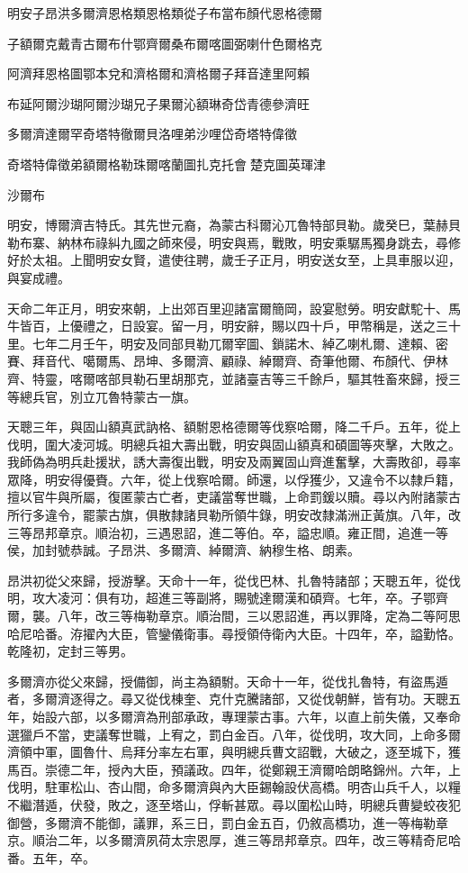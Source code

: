 
\begin{pinyinscope}
明安子昂洪多爾濟恩格類恩格類從子布當布顏代恩格德爾

子額爾克戴青古爾布什鄂齊爾桑布爾喀圖弼喇什色爾格克

阿濟拜恩格圖鄂本兌和濟格爾和濟格爾子拜音達里阿賴

布延阿爾沙瑚阿爾沙瑚兄子果爾沁額琳奇岱青德參濟旺

多爾濟達爾罕奇塔特徹爾貝洛哩弟沙哩岱奇塔特偉徵

奇塔特偉徵弟額爾格勒珠爾喀蘭圖扎克托會楚克圖英琿津

沙爾布

明安，博爾濟吉特氏。其先世元裔，為蒙古科爾沁兀魯特部貝勒。歲癸巳，葉赫貝勒布寨、納林布祿糾九國之師來侵，明安與焉，戰敗，明安乘驏馬獨身跳去，尋修好於太祖。上聞明安女賢，遣使往聘，歲壬子正月，明安送女至，上具車服以迎，與宴成禮。

天命二年正月，明安來朝，上出郊百里迎諸富爾簡岡，設宴慰勞。明安獻駝十、馬牛皆百，上優禮之，日設宴。留一月，明安辭，賜以四十戶，甲幣稱是，送之三十里。七年二月壬午，明安及同部貝勒兀爾宰圖、鎖諾木、綽乙喇札爾、達賴、密賽、拜音代、噶爾馬、昂坤、多爾濟、顧祿、綽爾齊、奇筆他爾、布顏代、伊林齊、特靈，喀爾喀部貝勒石里胡那克，並諸臺吉等三千餘戶，驅其牲畜來歸，授三等總兵官，別立兀魯特蒙古一旗。

天聰三年，與固山額真武訥格、額駙恩格德爾等伐察哈爾，降二千戶。五年，從上伐明，圍大凌河城。明總兵祖大壽出戰，明安與固山額真和碩圖等夾擊，大敗之。我師偽為明兵赴援狀，誘大壽復出戰，明安及兩翼固山齊進奮擊，大壽敗卻，尋率眾降，明安得優賚。六年，從上伐察哈爾。師還，以俘獲少，又違令不以隸戶籍，擅以官牛與所屬，復匿蒙古亡者，吏議當奪世職，上命罰鍰以贖。尋以內附諸蒙古所行多違令，罷蒙古旗，俱散隸諸貝勒所領牛錄，明安改隸滿洲正黃旗。八年，改三等昂邦章京。順治初，三遇恩詔，進二等伯。卒，謚忠順。雍正間，追進一等侯，加封號恭誠。子昂洪、多爾濟、綽爾濟、納穆生格、朗素。

昂洪初從父來歸，授游擊。天命十一年，從伐巴林、扎魯特諸部；天聰五年，從伐明，攻大凌河：俱有功，超進三等副將，賜號達爾漢和碩齊。七年，卒。子鄂齊爾，襲。八年，改三等梅勒章京。順治間，三以恩詔進，再以罪降，定為二等阿思哈尼哈番。洊擢內大臣，管鑾儀衛事。尋授領侍衛內大臣。十四年，卒，謚勤恪。乾隆初，定封三等男。

多爾濟亦從父來歸，授備御，尚主為額駙。天命十一年，從伐扎魯特，有盜馬遁者，多爾濟逐得之。尋又從伐棟奎、克什克騰諸部，又從伐朝鮮，皆有功。天聰五年，始設六部，以多爾濟為刑部承政，專理蒙古事。六年，以直上前失儀，又奉命選獵戶不當，吏議奪世職，上宥之，罰白金百。八年，從伐明，攻大同，上命多爾濟領中軍，圖魯什、烏拜分率左右軍，與明總兵曹文詔戰，大破之，逐至城下，獲馬百。崇德二年，授內大臣，預議政。四年，從鄭親王濟爾哈朗略錦州。六年，上伐明，駐軍松山、杏山間，命多爾濟與內大臣錫翰設伏高橋。明杏山兵千人，以糧不繼潛遁，伏發，敗之，逐至塔山，俘斬甚眾。尋以圍松山時，明總兵曹變蛟夜犯御營，多爾濟不能御，議罪，系三日，罰白金五百，仍敘高橋功，進一等梅勒章京。順治二年，以多爾濟夙荷太宗恩厚，進三等昂邦章京。四年，改三等精奇尼哈番。五年，卒。


\end{pinyinscope}
